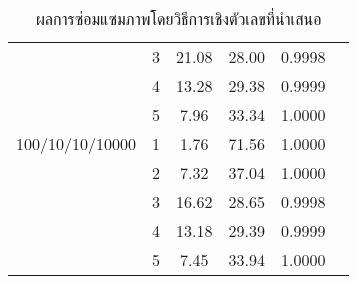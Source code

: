 \begin{table}[H]
\begin{tabular}[ht]{|l|c|c|c|c|c|}
        & 3 & 21.08 & 28.00 & 0.9998 \\
        & 4 & 13.28 & 29.38 & 0.9999 \\
        & 5 & 7.96 & 33.34 & 1.0000\\
        \hline
        100/10/10/10000  & 1 & 1.76 & 71.56 & 1.0000 \\
        & 2 & 7.32 & 37.04 & 1.0000\\
        & 3 & 16.62 & 28.65 & 0.9998 \\
        & 4 & 13.18 & 29.39 & 0.9999\\
        & 5 & 7.45 & 33.94 & 1.0000 \\
        \hline
    \end{tabular}
    \caption{ผลการซ่อมแซมภาพโดยวิธีการเชิงตัวเลขที่นำเสนอ}
    \label{table:multiresolution}
\end{table}	
